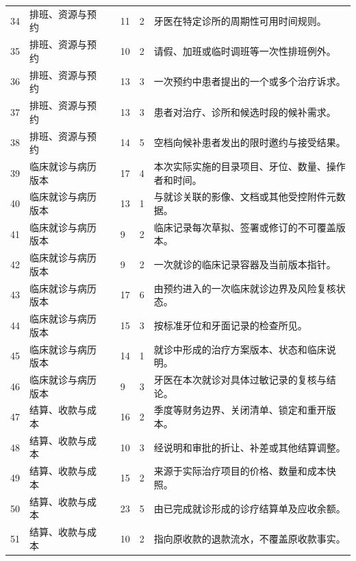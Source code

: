 \begin{longtable}{@{}C{8mm}L{27mm}L{42mm}C{10mm}C{10mm}L{49mm}@{}}
34 & 排班、资源与预约 &  & 11 & 2 & 牙医在特定诊所的周期性可用时间规则。 \\
35 & 排班、资源与预约 &  & 10 & 2 & 请假、加班或临时调班等一次性排班例外。 \\
36 & 排班、资源与预约 &  & 13 & 3 & 一次预约中患者提出的一个或多个治疗诉求。 \\
37 & 排班、资源与预约 &  & 13 & 3 & 患者对治疗、诊所和候选时段的候补需求。 \\
38 & 排班、资源与预约 &  & 14 & 5 & 空档向候补患者发出的限时邀约与接受结果。 \\
39 & 临床就诊与病历版本 &  & 17 & 4 & 本次实际实施的目录项目、牙位、数量、操作者和时间。 \\
40 & 临床就诊与病历版本 &  & 13 & 1 & 与就诊关联的影像、文档或其他受控附件元数据。 \\
41 & 临床就诊与病历版本 &  & 9 & 2 & 临床记录每次草拟、签署或修订的不可覆盖版本。 \\
42 & 临床就诊与病历版本 &  & 9 & 2 & 一次就诊的临床记录容器及当前版本指针。 \\
43 & 临床就诊与病历版本 &  & 17 & 6 & 由预约进入的一次临床就诊边界及风险复核状态。 \\
44 & 临床就诊与病历版本 &  & 15 & 3 & 按标准牙位和牙面记录的检查所见。 \\
45 & 临床就诊与病历版本 &  & 14 & 1 & 就诊中形成的治疗方案版本、状态和临床说明。 \\
46 & 临床就诊与病历版本 &  & 9 & 3 & 牙医在本次就诊对具体过敏记录的复核与结论。 \\
47 & 结算、收款与成本 &  & 16 & 2 & 季度等财务边界、关闭清单、锁定和重开版本。 \\
48 & 结算、收款与成本 &  & 10 & 3 & 经说明和审批的折让、补差或其他结算调整。 \\
49 & 结算、收款与成本 &  & 15 & 2 & 来源于实际治疗项目的价格、数量和成本快照。 \\
50 & 结算、收款与成本 &  & 23 & 5 & 由已完成就诊形成的诊疗结算单及应收余额。 \\
51 & 结算、收款与成本 &  & 10 & 2 & 指向原收款的退款流水，不覆盖原收款事实。 \\

\end{longtable}
